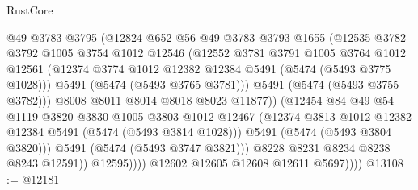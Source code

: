\begin{lexlean}{RustCore}
\begin{coremodule}
                            @49
                            @3783
                            @3795
                            (@12824
                              @652
                              @56
                              @49
                              @3783
                              @3793
                              @1655
                              (@12535
                                @3782
                                @3792
                                @1005
                                @3754
                                @1012
                                @12546
                                (@12552
                                  @3781
                                  @3791
                                  @1005
                                  @3764
                                  @1012
                                  @12561
                                  (@12374
                                    @3774
                                    @1012
                                    @12382
                                    @12384
                                    @5491
                                    (@5474 (@5493 @3775 @1028)))
                                  @5491
                                  (@5474 (@5493 @3765 @3781)))
                                @5491
                                (@5474 (@5493 @3755 @3782)))
                              @8008
                              @8011
                              @8014
                              @8018
                              @8023
                              @11877))
                          (@12454
                            @84
                            @49
                            @54
                            @1119
                            @3820
                            @3830
                            @1005
                            @3803
                            @1012
                            @12467
                            (@12374 @3813 @1012 @12382 @12384 @5491 (@5474 (@5493 @3814 @1028)))
                            @5491
                            (@5474 (@5493 @3804 @3820)))
                          @5491
                          (@5474 (@5493 @3747 @3821)))
                        @8228
                        @8231
                        @8234
                        @8238
                        @8243
                        @12591))
                    @12595))))
            @12602
            @12605
            @12608
            @12611
            @5697))))
@13108 := @12181

\end{coremodule}
\end{lexlean}
